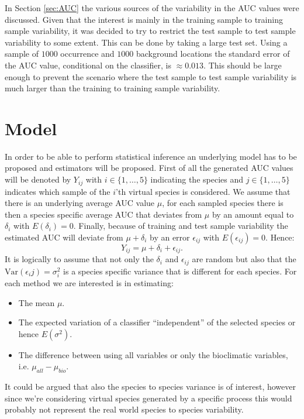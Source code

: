In Section \ref{sec:AUC} the various sources of the variability in the AUC values were discussed. Given that the interest is mainly in the training sample to training sample variability, it was decided to try to restrict the test sample to test sample variability to some extent. This can be done by taking a large test set. Using a sample of $1000$ occurrence and $1000$ background locations the standard error of the AUC value, conditional on the classifier, is $\approx 0.013$. This should be large enough to prevent the scenario where the test sample to test sample variability is much larger than the training to training sample variability.

\section{Model}

In order to be able to perform statistical inference an underlying model has to be proposed and estimators will be proposed. First of all the generated AUC values will be denoted by $Y_{ij}$ with $i \in \{1,\ldots,5\}$ indicating the species and $j \in \{1,\ldots,5\}$ indicates which sample of the $i$'th virtual species is considered. We assume that there is an underlying average AUC value $\mu$, for each sampled species there is then a species specific average AUC that deviates from $\mu$ by an amount equal to $\delta_i$ with $E(\delta_i) = 0$. Finally, because of training and test sample variability the estimated AUC will deviate from $\mu + \delta_i$ by an error $\epsilon_{ij}$ with $E(\epsilon_{ij}) = 0$. Hence:
\begin{equation}
\label{•}
Y_{ij} = \mu + \delta_i + \epsilon_{ij}.
\end{equation}
It is logically to assume that not only the $\delta_i$ and $\epsilon_{ij}$ are random but also that the $\text{Var}(\epsilon_ij) = \sigma_i^2$ is a species specific variance that is different for each species. For each method we are interested is in estimating:
\begin{itemize}
\item The mean $\mu$.
\item The expected variation of a classifier ``independent'' of the selected species or hence $E(\sigma^2)$.
\item The difference between using all variables or only the bioclimatic variables, i.e. $\mu_{all} - \mu_{bio}$.
\end{itemize} 
It could be argued that also the species to species variance is of interest, however since we're considering virtual species generated by a specific process this would probably not represent the real world species to species variability. \\

